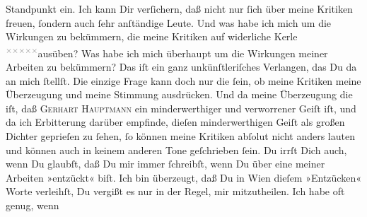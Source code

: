 \begin{ledgroupsized}[t]{13cm}
{{{{                  Standpunkt}}}}\label{K_L03091-2h} ein. Ich kann Dir verſichern, daß
                  {\pb}nicht nur \label{K_L03091-3v}\label{K_L03091-3h} ſich über meine Kritiken freuen, ſondern auch ſehr anſtändige Leute. Und was
               habe ich mich um die Wirkungen zu bekümmern, die meine Kritiken { } auf widerliche Kerle \substVorne{}\textsuperscript{\textcolor{gray}{×}\-\textcolor{gray}{×}\-\textcolor{gray}{×}\-\textcolor{gray}{×}\-\textcolor{gray}{×}}\substDazwischen{}ausüben\substHinten{}? Was habe ich mich überhaupt um die Wirkungen meiner Arbeiten zu bekümmern?
               Das iſt \strikeout{\textcolor{gray}{doch}} ein ganz unkünſtleriſches Verlangen, das Du da an mich ſtellſt. Die einzige
               Frage kann doch nur die ſein, ob meine Kritiken meine Überzeugung und meine Stimmung
               ausdrücken. Und da meine Überzeugung die iſt, daß \textsc{Gerhart Hauptmann} ein minderwerthiger {\pb}und verworrener Geiſt
               iſt, und da ich Erbitterung darüber empfinde, dieſen minderwerthigen Geiſt als großen Dichter
               geprieſen zu ſehen, ſo \strikeout{\textcolor{gray}{ſ}} können meine Kritiken abſolut nicht anders lauten und können auch in keinem
               anderen Tone geſchrieben ſein.\pend
           \pstart
           Du irrſt Dich auch, wenn Du glaubſt, daß Du mir immer ſchreibſt, wenn Du über eine
               meiner Arbeiten »entzückt« biſt. Ich bin überzeugt, daß Du in Wien dieſem »Entzücken« Worte verleihſt, Du vergißt es nur in
               der {\pb}Regel, mir mitzutheilen. Ich habe oft genug, wenn

\end{ledgroupsized}
